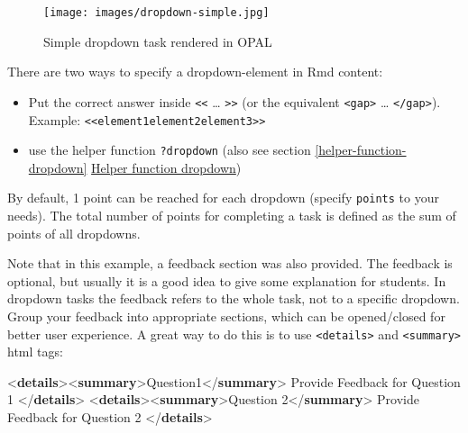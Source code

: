 \documentclass[twoside]{tufte-book}
\newenvironment{Shaded}{}{}
\newcommand{\DataTypeTok}[1]{\textcolor[rgb]{0.56,0.13,0.00}{#1}}
\newcommand{\KeywordTok}[1]{\textcolor[rgb]{0.00,0.44,0.13}{\textbf{#1}}}
\newcommand{\NormalTok}[1]{#1}
\providecommand{\tightlist}{%
  \setlength{\itemsep}{0pt}\setlength{\parskip}{0pt}}
\begin{document}
\begin{figure*}
\centering
\texttt{[image: images/dropdown-simple.jpg]}
\caption{\label{dd1opal}Simple dropdown task rendered in OPAL}
\end{figure*}
\newpage
There are two ways to specify a dropdown-element in Rmd content:

\begin{itemize}
\tightlist
\item
  Put the correct answer inside \texttt{\textless{}\textless{}} \ldots{} \texttt{\textgreater{}\textgreater{}} (or the equivalent \texttt{\textless{}gap\textgreater{}} \ldots{} \texttt{\textless{}/gap\textgreater{}}). Example: \texttt{\textless{}\textless{}element1\textbar{}element2\textbar{}element3\textgreater{}\textgreater{}}
\item
  use the helper function \texttt{?dropdown} (also see section \ref{helper-function-dropdown} \hyperref[helper-function-dropdown]{Helper function dropdown})
\end{itemize}

By default, 1 point can be reached for each dropdown (specify \texttt{points} to your needs). The total number of points for completing a task is defined as the sum of points of all dropdowns.

Note that in this example, a feedback section was also provided. The feedback is
optional, but usually it is a good idea to give some explanation for students. In dropdown tasks the feedback refers to the whole task, not to a specific dropdown. Group your feedback into appropriate sections, which can be opened/closed for better user experience. A great way to do this is to use \texttt{\textless{}details\textgreater{}} and \texttt{\textless{}summary\textgreater{}} html tags:

\begin{Shaded}
\begin{Highlighting}[]
\DataTypeTok{\textless{}}\KeywordTok{details}\DataTypeTok{\textgreater{}\textless{}}\KeywordTok{summary}\DataTypeTok{\textgreater{}}\NormalTok{Question1}\DataTypeTok{\textless{}/}\KeywordTok{summary}\DataTypeTok{\textgreater{}}
\NormalTok{  Provide Feedback for Question 1}
\DataTypeTok{\textless{}/}\KeywordTok{details}\DataTypeTok{\textgreater{}}
\DataTypeTok{\textless{}}\KeywordTok{details}\DataTypeTok{\textgreater{}\textless{}}\KeywordTok{summary}\DataTypeTok{\textgreater{}}\NormalTok{Question 2}\DataTypeTok{\textless{}/}\KeywordTok{summary}\DataTypeTok{\textgreater{}}
\NormalTok{  Provide Feedback for Question 2}
\DataTypeTok{\textless{}/}\KeywordTok{details}\DataTypeTok{\textgreater{}}
\end{Highlighting}
\end{Shaded}
\end{document}
